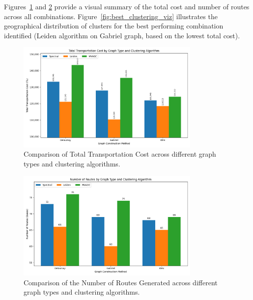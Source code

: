 Figures~\ref{fig:cost_comparison} and \ref{fig:routes_comparison} provide a visual summary of the total cost and number of routes across all combinations. Figure~\ref{fig:best_clustering_viz} illustrates the geographical distribution of clusters for the best performing combination identified (Leiden algorithm on Gabriel graph, based on the lowest total cost).

\begin{figure}[h]
    \centering
    \includegraphics[width=0.8\textwidth]{img/cost_comparison}
    \caption{Comparison of Total Transportation Cost across different graph types and clustering algorithms.}
    \label{fig:cost_comparison}
\end{figure}

\begin{figure}[h]
    \centering
    \includegraphics[width=0.8\textwidth]{img/route_count_comparison}
    \caption{Comparison of the Number of Routes Generated across different graph types and clustering algorithms.}
    \label{fig:routes_comparison}
\end{figure}

